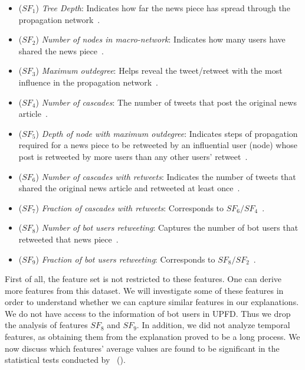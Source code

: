 \begin{itemize}
    \item ($SF_1$) \emph{Tree Depth}: Indicates how far the news piece has spread through the propagation network~\parencite{HierarchicalPropagationNetworksForFND_Shu}.
    \item ($SF_2$) \emph{Number of nodes in macro-network}: Indicates how many users have shared the news piece~\parencite{HierarchicalPropagationNetworksForFND_Shu}.
    \item ($SF_3$) \emph{Maximum outdegree}: Helps reveal the tweet/retweet with the most influence in the propagation network~\parencite{HierarchicalPropagationNetworksForFND_Shu}.
    \item ($SF_4$) \emph{Number of cascades}: The number of tweets that post the original news article~\parencite{HierarchicalPropagationNetworksForFND_Shu}.
    \item ($SF_5$) \emph{Depth of node with maximum outdegree}: Indicates steps of propagation required for a news piece to be retweeted by an influential user (node) whose post is retweeted by more users than any other users' retweet~\parencite{HierarchicalPropagationNetworksForFND_Shu}.
    \item ($SF_6$) \emph{Number of cascades with retweets}: Indicates the number of tweets that shared the original news article and retweeted at least once~\parencite{HierarchicalPropagationNetworksForFND_Shu}.
    \item ($SF_7$) \emph{Fraction of cascades with retweets}: Corresponds to $SF_6 / SF_4$~\parencite{HierarchicalPropagationNetworksForFND_Shu}.
    \item ($SF_8$) \emph{Number of bot users retweeting}: Captures the number of bot users that retweeted that news piece~\parencite{HierarchicalPropagationNetworksForFND_Shu}.
    \item ($SF_9$) \emph{Fraction of bot users retweeting}: Corresponds to $SF_8 / SF_2$~\parencite{HierarchicalPropagationNetworksForFND_Shu}.
\end{itemize}
First of all, the feature set is not restricted to these features. One can derive more features from this dataset. We
will investigate some of these features in order to understand whether we can capture similar features in our explanations.
We do not have access to the information of bot users in UPFD. Thus we drop the analysis of features $SF_8$ and $SF_9$. In addition, we did not analyze temporal features, as obtaining them from the explanation proved to be a long process. We now discuss which features' average values are found to be significant in the statistical tests conducted by~\citeauthor{HierarchicalPropagationNetworksForFND_Shu} (\citeyear{HierarchicalPropagationNetworksForFND_Shu}).\\
